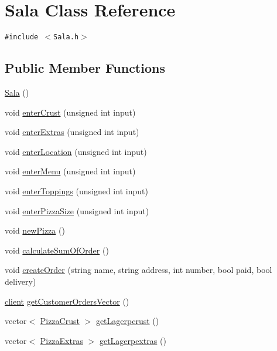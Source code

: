 \hypertarget{class_sala}{
\section{Sala Class Reference}
\label{class_sala}
}
{\tt \#include $<$Sala.h$>$}

\subsection*{Public Member Functions}
\begin{CompactItemize}
\item 
\hyperlink{class_sala_da283dd136f3f0c2703d0356f49c1e6e}{Sala} ()
\item 
void \hyperlink{class_sala_ae3b8375ca0ab5b62e84f86582b8cec3}{enter\-Crust} (unsigned int input)
\item 
void \hyperlink{class_sala_f4637151f3f934bdf727685020e956e2}{enter\-Extras} (unsigned int input)
\item 
void \hyperlink{class_sala_d5b546b927926e2eed280fcdc087135e}{enter\-Location} (unsigned int input)
\item 
void \hyperlink{class_sala_1015bfdd699f9dc90a677a87def0b37b}{enter\-Menu} (unsigned int input)
\item 
void \hyperlink{class_sala_34479ade70e563ba9c7eb9b66df2270e}{enter\-Toppings} (unsigned int input)
\item 
void \hyperlink{class_sala_caeeb8aada209ebb8bde4749b2ececdc}{enter\-Pizza\-Size} (unsigned int input)
\item 
void \hyperlink{class_sala_eadce54d849ca6634b7fdd389bd8f192}{new\-Pizza} ()
\item 
void \hyperlink{class_sala_24b9bb5302a251b41fed3df1fb7ce8ad}{calculate\-Sum\-Of\-Order} ()
\item 
void \hyperlink{class_sala_9f3c48158017cdc015a985e9712f0179}{create\-Order} (string name, string address, int number, bool paid, bool delivery)
\item 
\hyperlink{classclient}{client} \hyperlink{class_sala_3a31e5a83058a950f863932d3ecaef2e}{get\-Customer\-Orders\-Vector} ()
\item 
vector$<$ \hyperlink{class_pizza_crust}{Pizza\-Crust} $>$ \hyperlink{class_sala_85a631cad1f4009e87de7da3bc52174c}{get\-Lagerpcrust} ()
\item 
vector$<$ \hyperlink{class_pizza_extras}{Pizza\-Extras} $>$ \hyperlink{class_sala_49f231948b80188691882a8624a4612d}{get\-Lagerpextras} ()
\item 

\end{CompactItemize}
